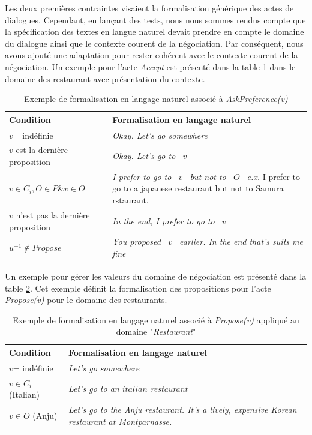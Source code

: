 			Les deux premières contraintes visaient la formalisation générique des actes de dialogues. Cependant, en lançant des tests, nous nous sommes rendus compte que la spécification des textes en langue naturel devait prendre en compte le domaine du dialogue ainsi que le contexte courent de la négociation. 
			Par conséquent, nous avons ajouté une adaptation pour rester cohérent avec le contexte courent de la négociation. Un exemple pour l'acte \emph{Accept} est présenté dans la table \ref{tab:AcceptEx} dans le domaine des restaurant avec présentation du contexte.
			
			\begin{table} [h]
				\centering
				\begin{tabular} {p{4cm}| p{6.5cm}}
					\hline
					\hline
					\textbf{Condition} & \textbf{Formalisation en langage naturel} \\
					\hline
					$v$= indéfinie & \textit{Okay. Let's go somewhere} \\
					\hline
					$ v $ est la dernière proposition  & \textit{Okay. Let's go to \ $v$ \ } \\
					\hline
					 $ v \in C_i,  O \in P  \& v \in O$ & \textit{I prefer to go to \ $v$ \, but not to \ $O$\ }
															\newline \emph{e.x.} I prefer to go to a japanese restaurant but not to Samura rstaurant. \\
					\hline
					$ v $ n'est pas la dernière proposition & \textit{In the end, I prefer to go to  \ $v$ \ } \\
					\hline
					$u^{-1} \not \in Propose$ & \textit{You proposed  \ $v$ \ earlier. In the end that's suits me fine} \\
					\hline
					\hline
				\end{tabular}
				\caption{\label{tab:AcceptEx} Exemple de formalisation en langage naturel associé à \emph{AskPreference(v)}}
			\end{table}
			
			Un exemple pour gérer les valeurs du domaine de négociation est présenté dans la table \ref{tab:ProposeEx}. Cet exemple définit la formalisation des propositions pour l'acte \emph{Propose(v)} pour le domaine des restaurants.
					\begin{table} [h]
						\centering
						\begin{tabular} {p{3.5cm} p{7cm}}
							\hline
							\hline
							\textbf{Condition} & \textbf{Formalisation en langage naturel} \\
							\hline
							$v$= indéfinie & \textit{Let's go somewhere } \\
							\hline
							$ v \in C_i$ (Italian)  & \textit{Let's go to an $italian$ restaurant} \\
							\hline
							$v \in O$ (Anju) & \textit{Let's go to the Anju restaurant. It's a lively, expensive Korean restaurant at Montparnasse.}\\
							\hline
							\hline
						\end{tabular}
						\caption{\label{tab:ProposeEx} Exemple de formalisation en langage naturel associé à \emph{Propose(v)} appliqué au domaine "\textit{Restaurant}"}
					\end{table}
	
